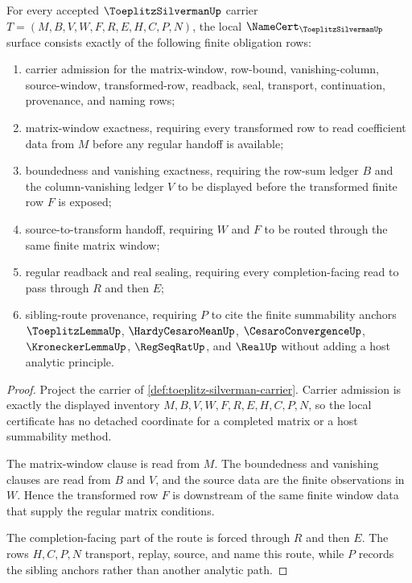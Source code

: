\begin{theorem}\label{thm:toeplitz-silverman-namecert-obligations}
For every accepted $\ToeplitzSilvermanUp$ carrier $T=(M,B,V,W,F,R,E,H,C,P,N)$, the local $\NameCert_{\ToeplitzSilvermanUp}$ surface consists exactly of the following finite obligation rows:
\begin{enumerate}
\item carrier admission for the matrix-window, row-bound, vanishing-column, source-window, transformed-row, readback, seal, transport, continuation, provenance, and naming rows;
\item matrix-window exactness, requiring every transformed row to read coefficient data from $M$ before any regular handoff is available;
\item boundedness and vanishing exactness, requiring the row-sum ledger $B$ and the column-vanishing ledger $V$ to be displayed before the transformed finite row $F$ is exposed;
\item source-to-transform handoff, requiring $W$ and $F$ to be routed through the same finite matrix window;
\item regular readback and real sealing, requiring every completion-facing read to pass through $R$ and then $E$;
\item sibling-route provenance, requiring $P$ to cite the finite summability anchors $\ToeplitzLemmaUp$, $\HardyCesaroMeanUp$, $\CesaroConvergenceUp$, $\KroneckerLemmaUp$, $\RegSeqRatUp$, and $\RealUp$ without adding a host analytic principle.
\end{enumerate}
\end{theorem}
\begin{proof}
Project the carrier of \autoref{def:toeplitz-silverman-carrier}. Carrier admission is exactly the displayed inventory $M,B,V,W,F,R,E,H,C,P,N$, so the local certificate has no detached coordinate for a completed matrix or a host summability method.

The matrix-window clause is read from $M$. The boundedness and vanishing clauses are read from $B$ and $V$, and the source data are the finite observations in $W$. Hence the transformed row $F$ is downstream of the same finite window data that supply the regular matrix conditions.

The completion-facing part of the route is forced through $R$ and then $E$. The rows $H,C,P,N$ transport, replay, source, and name this route, while $P$ records the sibling anchors rather than another analytic path.
\end{proof}

